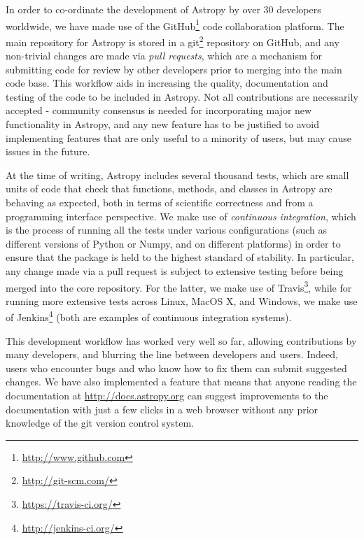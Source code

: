 \documentclass[traditabstract]{aa}
\begin{document}
\label{sec:workflow}




In order to co-ordinate the development of Astropy by over 30 developers
worldwide, we have made use of the
GitHub\footnote{\url{http://www.github.com}} code collaboration platform. The
main repository for Astropy is stored in a
git\footnote{\url{http://git-scm.com/}} repository on GitHub, and any
non-trivial changes are made via \textit{pull requests}, which are a mechanism
for submitting code for review by other developers prior to merging into the
main code base. This workflow aids in increasing the quality, documentation and
testing of the code to be included in Astropy. Not all contributions are
necessarily accepted - community consensus is needed for incorporating major
new functionality in Astropy, and any new feature has to be justified to avoid
implementing features that are only useful to a minority of users, but may
cause issues in the future.

At the time of writing, Astropy includes several thousand tests, which are
small units of code that check that functions, methods, and classes in Astropy are
behaving as expected, both in terms of scientific correctness and from a programming interface perspective. We
make use of \textit{continuous integration}, which is the process of running
all the tests under various configurations (such as different versions of
Python or Numpy, and on different platforms) in order to ensure that the
package is held to the highest standard of stability. In particular, any
change made via a pull request is subject to extensive testing before being
merged into the core repository. For the latter, we make use of
Travis\footnote{\url{https://travis-ci.org/}}, while for running more
extensive tests across Linux, MacOS X, and Windows, we make use of
Jenkins\footnote{\url{http://jenkins-ci.org/}} (both are examples of
continuous integration systems).

This development workflow has worked very well so far, allowing contributions
by many developers, and blurring the line between developers and users.
Indeed, users who encounter bugs and who know how to fix them can submit
suggested changes. We have also implemented a feature that means that anyone
reading the documentation at \url{http://docs.astropy.org} can suggest
improvements to the documentation with just a few clicks in a web browser without any prior knowledge of the git
version control system.
\end{document}

